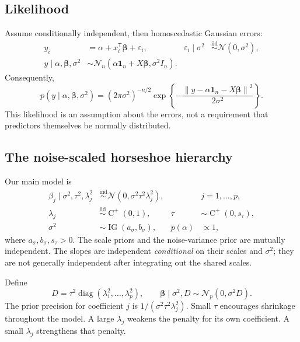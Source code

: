 \documentclass[11pt,letterpaper]{article}
\numberwithin{equation}{section}
\newcommand{\diag}{\operatorname{diag}}
\newcommand{\IG}{\operatorname{IG}}
\newcommand{\HC}{\operatorname{C}^{+}}
\newcommand{\Normal}{\mathcal{N}}
\newcommand{\given}{\mid}
\newcommand{\bbeta}{\bm{\beta}}
\newcommand{\ones}{\mathbf{1}}
\newcommand{\trans}{^{\mathsf T}}
\newcommand{\norm}[1]{\left\lVert#1\right\rVert}
\begin{document}
\subsection{Likelihood}

Assume conditionally independent, then homoscedastic Gaussian errors:
\begin{align}
 y_i &= \alpha+x_i\trans\bbeta+\varepsilon_i,
 & \varepsilon_i\given\sigma^2&\overset{\mathrm{iid}}\sim\Normal(0,\sigma^2),\\
 y\given\alpha,\bbeta,\sigma^2
 &\sim\Normal_n(\alpha\ones_n+X\bbeta,\sigma^2 I_n).
\end{align}
Consequently,
\begin{equation}\label{eq:likelihood}
 p(y\given\alpha,\bbeta,\sigma^2)
 =(2\pi\sigma^2)^{-n/2}
 \exp\left\{-\frac{\norm{y-\alpha\ones_n-X\bbeta}^2}{2\sigma^2}\right\}.
\end{equation}
This likelihood is an assumption about the errors, not a requirement that
predictors themselves be normally distributed.

\subsection{The noise-scaled horseshoe hierarchy}

Our main model is
\begin{align}
 \beta_j\given\sigma^2,\tau^2,\lambda_j^2
 &\overset{\mathrm{ind}}\sim\Normal(0,\sigma^2\tau^2\lambda_j^2),
 &&j=1,\ldots,p,\label{eq:coefprior}\\
 \lambda_j&\overset{\mathrm{iid}}\sim\HC(0,1),
 &\tau&\sim\HC(0,s_\tau),\label{eq:scalepriors}\\
 \sigma^2&\sim\IG(a_\sigma,b_\sigma),
 &p(\alpha)&\propto1,\label{eq:otherpriors}
\end{align}
where \(a_\sigma,b_\sigma,s_\tau>0\). The scale priors and the noise-variance
prior are mutually independent. The slopes are independent \emph{conditional}
on their scales and \(\sigma^2\); they are not generally independent after
integrating out the shared scales.

Define
\begin{equation}\label{eq:D}
 D=\tau^2\diag(\lambda_1^2,\ldots,\lambda_p^2),
 \qquad \bbeta\given\sigma^2,D\sim\Normal_p(0,\sigma^2D).
\end{equation}
The prior precision for coefficient \(j\) is
\(1/(\sigma^2\tau^2\lambda_j^2)\). Small \(\tau\) encourages shrinkage
throughout the model. A large \(\lambda_j\) weakens the penalty for its own
coefficient. A small \(\lambda_j\) strengthens that penalty.
\end{document}
